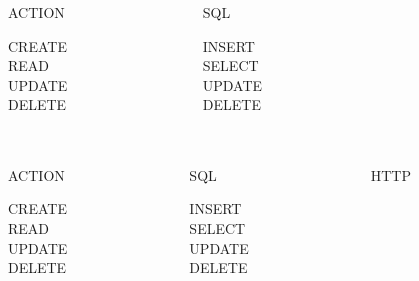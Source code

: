 \begin{frame}
  \frametitle{\insertsection}
  \begin{columns}
    \begin{column}{2cm}
      \begin{center}ACTION\end{center}
      CREATE\\
      READ\\
      UPDATE\\
      DELETE
    \end{column}    
    \begin{column}{2cm}
      \begin{center}SQL\end{center}
      INSERT\\
      SELECT\\
      UPDATE\\
      DELETE
    \end{column}
    \begin{column}{2cm}      
    \end{column}
  \end{columns}
\end{frame}

\begin{frame}
  \frametitle{\insertsection}
  \begin{columns}
    \begin{column}{2cm}
      \begin{center}ACTION\end{center}
      CREATE\\
      READ\\
      UPDATE\\
      DELETE
    \end{column}    
    \begin{column}{2cm}
      \begin{center}SQL\end{center}
      INSERT\\
      SELECT\\
      UPDATE\\
      DELETE
    \end{column}
    \begin{column}{2cm}   
      \begin{center}HTTP\end{center}
      \\
      \\
      \\
    \end{column}
  \end{columns}
\end{frame}

